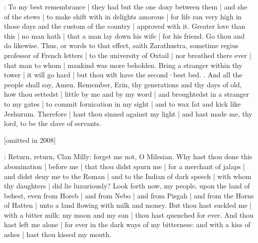 \stephen:
To my best remembrance |
they had but the one doxy between them |
and she of the stews |
to make shift with in delights amorous |
for life ran very high in those days
and the custom of the country |
approved with it.
Greater love than this |
no man hath |
that a man lay down his wife |
for his friend.
Go thou
and do likewise.
Thus,
or words to that effect,
saith Zarathustra,
sometime regius professor of French letters |
to the university of Oxtail |
nor breathed there ever |
that man to whom |
mankind was more beholden.
Bring a stranger within thy tower |
it will go hard |
but thou wilt have the second·best bed.
.
And all the people shall say,
Amen.
Remember,
Erin,
thy generations and thy days of old,
how thou settedst |
little by me and by my word |
and broughtedst in a stranger to my gates |
to commit fornication in my sight |
and to wax fat and kick like Jeshurum.
Therefore |
hast thou sinned against my light |
and hast made me,
thy lord,
to be the slave of servants.

[omitted in 2008]

\stephen:
Return,
return,
Clan Milly:
forget me not,
O Milesian.
Why hast thou done this abomination |
before me |
that thou didst spurn me |
for a merchant of jalaps |
and didst deny me to the Roman |
and to the Indian of dark speech |
with whom thy daughters |
did lie luxuriously?
Look forth now,
my people,
upon the land of behest,
even from Horeb |
and from Nebo |
and from Pisgah |
and from the Horns of Hatten |
unto a land flowing with milk and money.
But thou hast suckled me |
with a bitter milk:
my moon and my sun |
thou hast quenched for ever.
And thou hast left me alone |
for ever in the dark ways of my bitterness:
and with a kiss of ashes |
hast thou kissed my mouth.


